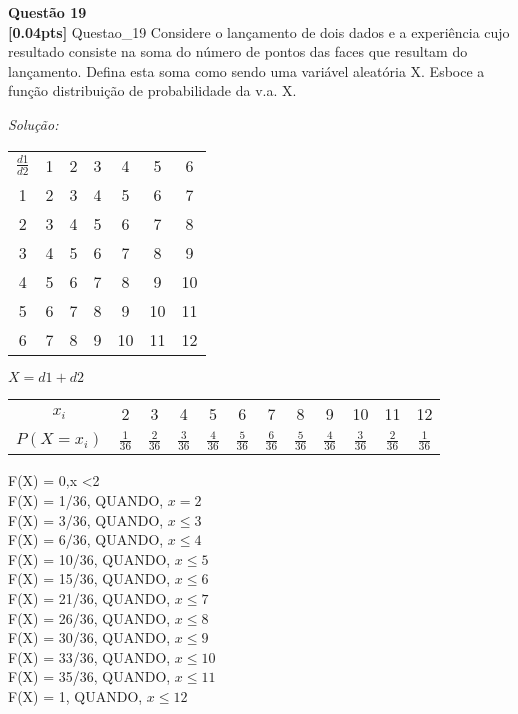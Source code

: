 \documentclass{article}
\newenvironment{problem}[2][Questão]
    { \begin{mdframed}[backgroundcolor=gray!20] \textbf{#1 #2} \\}
    {  \end{mdframed}}
\newenvironment{solution}
    {\textit{Solução:}}
    {}
\begin{document}
\begin{problem}{19}
\textbf{[0.04pts]} Questao\_19 Considere  o  lançamento  de  dois  dados  e  a  experiência  cujo  resultado  consiste  na soma  do  número  de  pontos  das  faces  que  resultam  do  lançamento.  Defina  esta  soma 
como sendo uma variável aleatória X. Esboce a função distribuição de probabilidade da v.a. X.
\end{problem}

\begin{solution}

\begin{center}
\begin{tabular}{ |c|c|c|c|c|c|c|}
\hline

$\frac{d1}{d2}$ & 1 & 2 & 3 & 4 & 5 & 6  \\
1 & 2 & 3 & 4 & 5 & 6 & 7 \\
2 & 3 & 4 & 5 & 6 & 7 & 8 \\
3 & 4 & 5 & 6 & 7 & 8 & 9 \\
4 & 5 & 6 & 7 & 8 & 9 & 10 \\
5 & 6 & 7 & 8 & 9 & 10 & 11 \\
6 & 7 & 8 & 9 & 10 & 11 & 12 \\
 \hline
\end{tabular}
\end{center}

$X= d1 + d2$

\begin{center}
\begin{tabular}{ |c|c|c|c|c|c|c|c|c|c|c|c|}
\hline

$x_{i}$ & 2 & 3 & 4 & 5 & 6 & 7 & 8 & 9 & 10 & 11 & 12  \\
$P(X=x_{i})$ & $\frac{1}{36}$ & $\frac{2}{36}$ & $\frac{3}{36}$ & $\frac{4}{36}$ & $\frac{5}{36}$ & $\frac{6}{36}$ & $\frac{5}{36}$ & $\frac{4}{36}$ & $\frac{3}{36}$ & $\frac{2}{36}$ & $\frac{1}{36}$  \\

 \hline
\end{tabular}
\end{center}

F(X) = 0,x <2 \\
F(X) = 1/36,  QUANDO, $x =2$ \\
F(X) = 3/36,  QUANDO, $x\leq3$ \\
F(X) = 6/36,  QUANDO, $x\leq4$ \\
F(X) = 10/36, QUANDO, $x\leq5$ \\
F(X) = 15/36, QUANDO, $x\leq6$ \\
F(X) = 21/36, QUANDO, $x\leq7$ \\
F(X) = 26/36, QUANDO, $x\leq8$ \\
F(X) = 30/36, QUANDO, $x\leq9$ \\
F(X) = 33/36, QUANDO, $x\leq10$ \\
F(X) = 35/36, QUANDO, $x\leq11$ \\
F(X) = 1,     QUANDO, $x\leq12$ \\

\end{solution}
\end{document}
